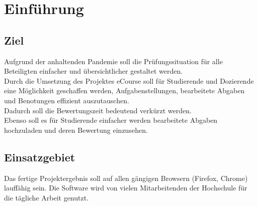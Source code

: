 
\chapter{Einführung}

\section{Ziel}
Aufgrund der anhaltenden Pandemie soll die Prüfungssituation für alle Beteiligten einfacher und übersichtlicher gestaltet werden. \\
Durch die Umsetzung des Projektes eCourse soll für Studierende und Dozierende eine Möglichkeit geschaffen werden, Aufgabenstellungen, bearbeitete Abgaben und Benotungen effizient auszutauschen. \\
Dadurch soll die Bewertungszeit bedeutend verkürzt werden. \\
Ebenso soll es für Studierende einfacher werden bearbeitete Abgaben hochzuladen und deren Bewertung einzusehen. \\

\section{Einsatzgebiet}
Das fertige Projektergebnis soll auf allen gängigen Browsern (Firefox, Chrome) lauffähig sein. Die Software wird von vielen Mitarbeitenden der Hochschule für die tägliche Arbeit genutzt. \\

